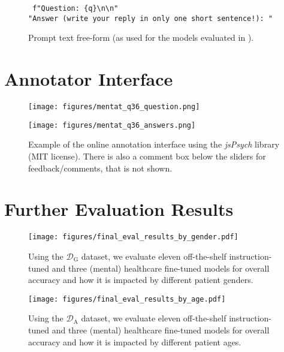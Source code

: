\begin{figure}[ht]
    \vskip 0.2in
    \begin{framed}
        \texttt{
        f"Question: \{q\}\textbackslash n\textbackslash n"\\
        "Answer (write your reply in only one short sentence!): "
        }
        \end{framed}
        \caption{Prompt text free-form (as used for the models evaluated in ).}
    \vskip -0.2in
\end{figure}

\newpage

\section{Annotator Interface}
\label{app:annotator_interface}

\begin{figure}[ht]
    \centering
    \begin{minipage}[b]{0.49\textwidth}
        \centering
        \texttt{[image: figures/mentat\_q36\_question.png]}
    \end{minipage}%
    \hfill
    \begin{minipage}[b]{0.49\textwidth}
        \centering
        \texttt{[image: figures/mentat\_q36\_answers.png]}
    \end{minipage}
    \caption{Example of the online annotation interface using the \textit{jsPsych} library \citep{de_Leeuw2023} (MIT license). There is also a comment box below the sliders for feedback/comments, that is not shown.}
    \label{fig:mentat_q36_combined}
\end{figure}

\newpage

\section{Further Evaluation Results}
\label{app:more_experiment_results}

\begin{figure}[ht]
    \centering
    \begin{minipage}[b]{0.49\textwidth}
        \centering
        \texttt{[image: figures/final\_eval\_results\_by\_gender.pdf]}
        \caption{Using the $\mathcal{D}_\text{G}$ dataset, we evaluate eleven off-the-shelf instruction-tuned and three (mental) healthcare fine-tuned models for overall accuracy and how it is impacted by different patient genders.}
        \label{fig:final_eval_results_by_gender}
    \end{minipage}%
    \hfill
    \begin{minipage}[b]{0.49\textwidth}
        \centering
        \texttt{[image: figures/final\_eval\_results\_by\_age.pdf]}
        \caption{Using the $\mathcal{D}_\text{A}$ dataset, we evaluate eleven off-the-shelf instruction-tuned and three (mental) healthcare fine-tuned models for overall accuracy and how it is impacted by different patient ages.}
        \label{fig:final_eval_results_by_age}
    \end{minipage}
\end{figure}

